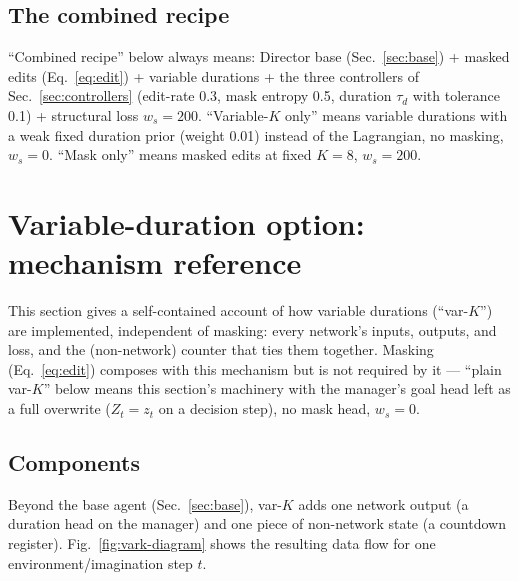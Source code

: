 \documentclass[10pt]{article}
\begin{document}
\subsection{The combined recipe}
``Combined recipe'' below always means: Director base
(Sec.~\ref{sec:base}) + masked edits (Eq.~\ref{eq:edit}) + variable durations
+ the three controllers of Sec.~\ref{sec:controllers} (edit-rate 0.3, mask
entropy 0.5, duration $\tau_d$ with tolerance 0.1) + structural loss
$w_s{=}200$. ``Variable-$K$ only'' means variable durations with a weak fixed
duration prior (weight 0.01) instead of the Lagrangian, no masking, $w_s{=}0$.
``Mask only'' means masked edits at fixed $K{=}8$, $w_s{=}200$.

\section{Variable-duration option: mechanism reference}
\label{sec:vark-mech}

This section gives a self-contained account of how variable durations
(``var-$K$'') are implemented, independent of masking: every network's inputs,
outputs, and loss, and the (non-network) counter that ties them together.
Masking (Eq.~\ref{eq:edit}) composes with this mechanism but is not required
by it --- ``plain var-$K$'' below means this section's machinery with the
manager's goal head left as a full overwrite ($Z_t = z_t$ on a decision step),
no mask head, $w_s{=}0$.

\subsection{Components}
Beyond the base agent (Sec.~\ref{sec:base}), var-$K$ adds one network output
(a duration head on the manager) and one piece of non-network state (a
countdown register). Fig.~\ref{fig:vark-diagram} shows the resulting data
flow for one environment/imagination step $t$.
\end{document}
